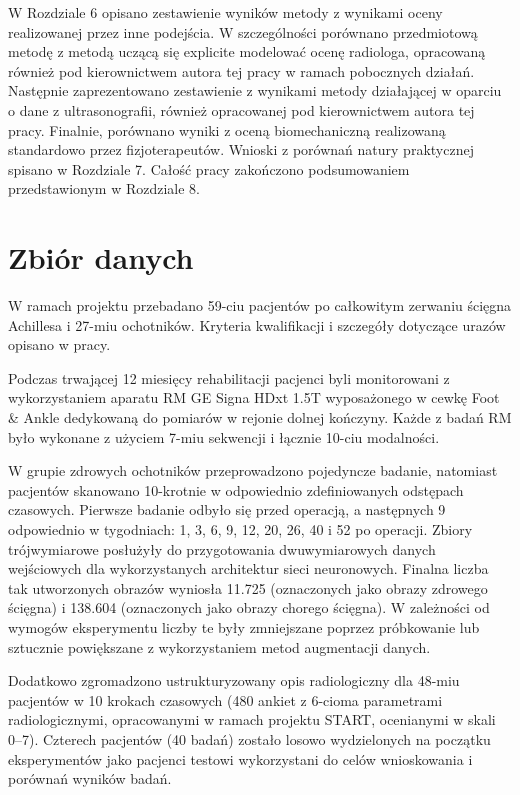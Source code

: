 W Rozdziale 6 opisano zestawienie wyników metody z wynikami oceny realizowanej przez inne podejścia. W szczególności porównano przedmiotową metodę z metodą uczącą się explicite modelować ocenę radiologa, opracowaną również pod kierownictwem autora tej pracy w ramach pobocznych działań. Następnie zaprezentowano zestawienie z wynikami metody działającej w oparciu o dane z ultrasonografii, również opracowanej pod kierownictwem autora tej pracy. Finalnie, porównano wyniki z oceną biomechaniczną realizowaną standardowo przez fizjoterapeutów. Wnioski z porównań natury praktycznej spisano w Rozdziale 7. Całość pracy zakończono podsumowaniem przedstawionym w Rozdziale 8.

{\let\clearpage\relax\chapter*{Zbiór danych}}

W ramach projektu przebadano 59-ciu pacjentów po całkowitym zerwaniu ścięgna Achillesa i 27-miu ochotników. Kryteria kwalifikacji i szczegóły dotyczące urazów opisano w pracy.

Podczas trwającej 12 miesięcy rehabilitacji pacjenci byli monitorowani z wykorzystaniem aparatu RM GE Signa HDxt 1.5T wyposażonego w cewkę Foot \& Ankle dedykowaną do pomiarów w rejonie dolnej kończyny. Każde z badań RM było wykonane z użyciem 7-miu sekwencji i łącznie 10-ciu modalności.

W grupie zdrowych ochotników przeprowadzono pojedyncze badanie, natomiast pacjentów skanowano 10-krotnie w odpowiednio zdefiniowanych odstępach czasowych. Pierwsze badanie odbyło się przed operacją, a następnych 9 odpowiednio w tygodniach: 1, 3, 6, 9, 12, 20, 26, 40 i 52 po operacji. Zbiory trójwymiarowe posłużyły do przygotowania dwuwymiarowych danych wejściowych dla wykorzystanych architektur sieci neuronowych. Finalna liczba tak utworzonych obrazów wyniosła 11.725 (oznaczonych jako obrazy zdrowego ścięgna) i 138.604 (oznaczonych jako obrazy chorego ścięgna). W zależności od wymogów eksperymentu liczby te były zmniejszane poprzez próbkowanie lub sztucznie powiększane z wykorzystaniem metod augmentacji danych.

Dodatkowo zgromadzono ustrukturyzowany opis radiologiczny dla 48-miu pacjentów w 10 krokach czasowych (480 ankiet z 6-cioma parametrami radiologicznymi, opracowanymi w ramach projektu START, ocenianymi w skali 0--7). Czterech pacjentów (40 badań) zostało losowo wydzielonych na początku eksperymentów jako pacjenci testowi wykorzystani do celów wnioskowania i porównań wyników badań.

